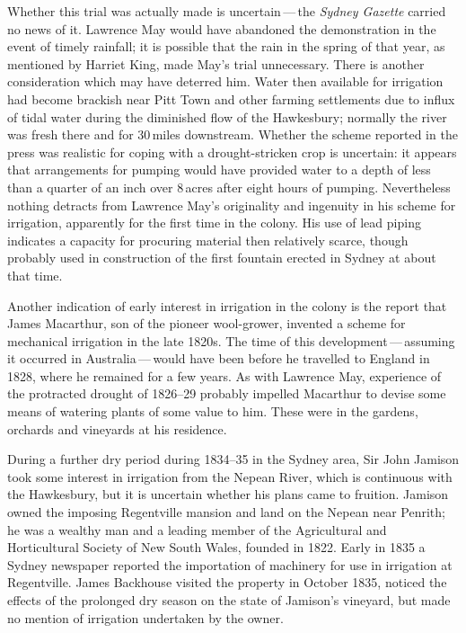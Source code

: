 Whether this trial was actually made is uncertain\,---\,the
\textit{Sydney Gaz\-ette} carried no news of it.  Lawrence May would
have abandoned the demonstration in the event of timely rainfall; it
is possible that the rain in the spring of that year, as mentioned by
Harriet King, made May's trial unnecessary.  There is another
consideration which may have deterred him.  Water then available for
irrigation had become brackish near Pitt Town and other farming
settlements due to influx of tidal water during the diminished flow of
the Hawkesbury; normally the river was fresh there and for 30\,miles
downstream.  Whether the
scheme reported in the press was realistic for coping with a
drought-stricken crop is uncertain: it appears that
arrangements for pumping would have provided water to a depth of less
than a quarter of an inch over 8\,acres after eight hours of pumping.
Nevertheless nothing detracts from Lawrence May's originality and
ingenuity in his scheme for irrigation, apparently for the first time
in the colony.  His use of lead piping indicates a capacity for
procuring material then relatively scarce, though probably used in
construction of the first fountain erected in Sydney at about that
time.

Another indication of early interest in irrigation in the colony is
the report that James Mac\-ar\-th\-ur, son of the
pioneer wool-grower, invented a scheme for mechanical
irrigation in the late 1820s.  The time of this
development\,---\,assuming it occurred in Australia\,---\,would have
been before he travelled to England in 1828, where he remained for a
few years.  As with Lawrence May, experience of the protracted
drought of 1826--29 probably impelled Macarthur to
devise some means of watering plants of some value to him.  These were
in the gardens, orchards and
vineyards at his
residence.

During a further dry period during 1834--35 in the Sydney area, Sir
John Jamison took some interest in irrigation from
the Nepean River,  which is continuous with the
Hawkesbury, but it is uncertain whether his plans came to fruition.
Jamison owned the imposing Regentville 
mansion and land on the Nepean near Penrith;  he
was a wealthy man and a leading member of the Agricultural and
Horticultural Society of New South Wales, founded in 1822.  Early in
1835 a Sydney newspaper reported the importation of machinery for use
in irrigation at Regentville.  James Backhouse
visited the property in October 1835, noticed the effects of the
prolonged dry season on the state of Jamison's vineyard, but made no
mention of irrigation undertaken by the owner.

